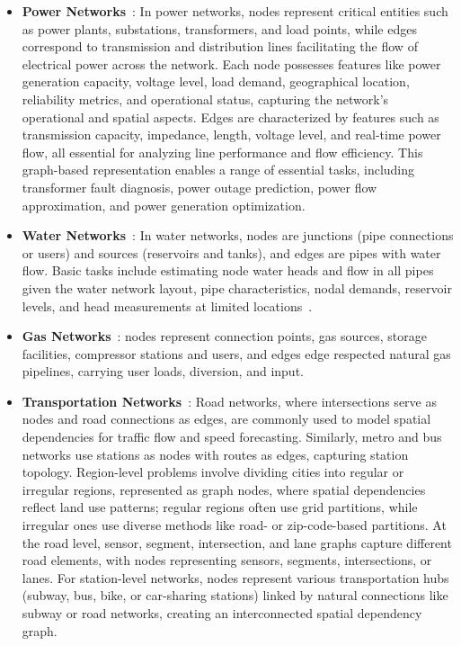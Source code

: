 \begin{itemize}[leftmargin=*]
    \item \textbf{Power Networks}~\cite{zimmerman2010matpower, owerko2020optimal, liao2021review}: In power networks, nodes represent critical entities such as power plants, substations, transformers, and load points, while edges correspond to transmission and distribution lines facilitating the flow of electrical power across the network. Each node possesses features like power generation capacity, voltage level, load demand, geographical location, reliability metrics, and operational status, capturing the network's operational and spatial aspects. Edges are characterized by features such as transmission capacity, impedance, length, voltage level, and real-time power flow, all essential for analyzing line performance and flow efficiency. This graph-based representation enables a range of essential tasks, including transformer fault diagnosis, power outage prediction, power flow approximation, and power generation optimization.

    \item \textbf{Water Networks}~\cite{xing2022graph}: In water networks, nodes are junctions (pipe connections or users) and sources (reservoirs and tanks), and edges are pipes with water flow. Basic tasks include estimating node water heads and flow in all pipes given the water network layout, pipe characteristics, nodal demands, reservoir levels, and head measurements at limited locations~\cite{candelieri2014graph}.

    \item \textbf{Gas Networks}~\cite{wang2024multiscale, yang2023graph}: nodes represent connection points, gas sources, storage facilities, compressor stations and users, and edges edge respected natural gas pipelines, carrying user loads, diversion, and input. 

    \item \textbf{Transportation Networks}~\cite{wang2020traffic, jiang2022graph}: Road networks, where intersections serve as nodes and road connections as edges, are commonly used to model spatial dependencies for traffic flow and speed forecasting. Similarly, metro and bus networks use stations as nodes with routes as edges, capturing station topology. Region-level problems involve dividing cities into regular or irregular regions, represented as graph nodes, where spatial dependencies reflect land use patterns; regular regions often use grid partitions, while irregular ones use diverse methods like road- or zip-code-based partitions. At the road level, sensor, segment, intersection, and lane graphs capture different road elements, with nodes representing sensors, segments, intersections, or lanes. For station-level networks, nodes represent various transportation hubs (subway, bus, bike, or car-sharing stations) linked by natural connections like subway or road networks, creating an interconnected spatial dependency graph.


\end{itemize}
